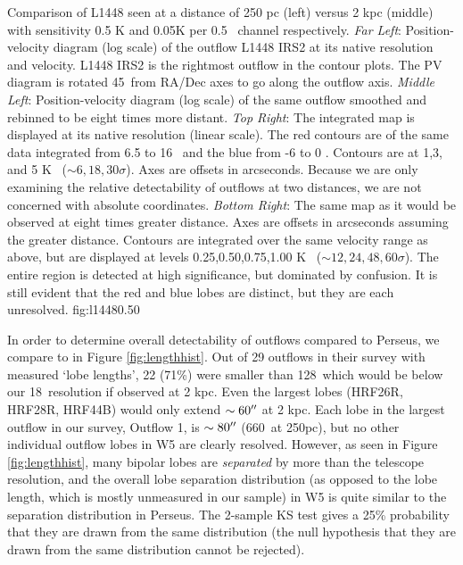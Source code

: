 {Comparison of L1448 seen at a distance of 250 pc (left) versus 2 kpc (middle) with
sensitivity 0.5 K and 0.05K per 0.5 \kms\ channel respectively.  {\it Far
Left}: Position-velocity diagram (log scale) of the outflow L1448 IRS2 at its
native resolution and velocity.  L1448 IRS2 is the rightmost outflow in the contour 
plots.  The PV diagram is rotated 45\arcdeg\ from RA/Dec axes to go along the outflow
axis.
{\it Middle Left}: Position-velocity diagram (log scale) of the same outflow smoothed
and rebinned to be eight times more distant.
{\it Top Right}: The integrated map is displayed at its native resolution (linear scale).
The red contours are of the same data integrated from 6.5 to 16 \kms\ and the blue from 
-6 to 0 \kms.  Contours are at 1,3, and 5 K \kms\ ($\sim 6, 18, 30 \sigma$).  Axes
are offsets in arcseconds.  Because we are only examining the relative detectability of
outflows at two distances, we are not concerned with absolute coordinates.
{\it Bottom Right}: The same map as it would be observed at eight times greater
distance.  Axes are offsets in arcseconds assuming the greater distance.
Contours are integrated over the same velocity range as above, but are
displayed at levels 0.25,0.50,0.75,1.00 K \kms\ ($\sim 12, 24, 48, 60 \sigma$).
The entire region is detected at high significance, but dominated by confusion.
It is still evident that the red and blue lobes are distinct, but they are each
unresolved. 
}
{fig:l1448}{0.5}{0}

In order to determine overall detectability of outflows compared to Perseus, we
compare to \citet{curtis2010} in Figure \ref{fig:lengthhist}.  Out of 29
outflows in their survey with measured `lobe lengths', 22 (71\%) were smaller
than 128\arcsec\, which would be below our 18\arcsec\ resolution if 
observed at 2 kpc.  Even the largest lobes (HRF26R,
HRF28R, HRF44B) would only extend $\sim60\mbox{$^{\prime\prime}$}$ at 2 kpc.  Each lobe in the
largest outflow in our survey, Outflow 1, is $\sim80\mbox{$^{\prime\prime}$}$ (660\arcsec\ at
250pc), but no other individual outflow lobes in W5 are clearly resolved.
However, as seen in Figure \ref{fig:lengthhist}, many bipolar lobes are
\emph{separated} by more than the telescope resolution, and the overall lobe
separation distribution (as opposed to the lobe length, which is mostly unmeasured
in our sample) in W5 is quite similar to the separation distribution in
Perseus.  The 2-sample KS test gives a 25\% probability that they are drawn
from the same distribution (the null hypothesis that they are drawn from the
same distribution cannot be rejected).  

